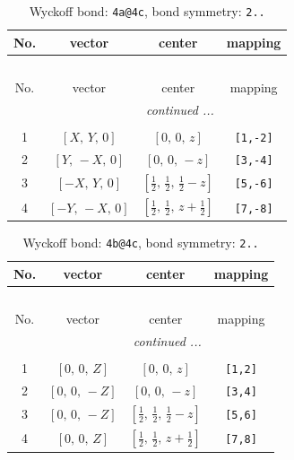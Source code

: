\documentclass[fleqn,8pt]{jsarticle}
\begin{document}
\begin{longtable}{cccc}
\caption{Wyckoff bond: {\tt 4a@4c}, bond symmetry: {\tt 2..}}
 \\
 \hline \hline
No. & vector & center & mapping \\ \hline \endfirsthead

\multicolumn{3}{l}{\tablename\ \thetable{}} \\
 \hline \hline
No. & vector & center & mapping \\ \hline \endhead

 \hline \hline
\multicolumn{3}{r}{\footnotesize\it continued ...} \\ \endfoot

 \hline \hline
\multicolumn{3}{r}{} \\ \endlastfoot

1 & $\left[ X,\, Y,\, 0 \right]$ & $\left[ 0,\, 0,\, z \right]$ & {\tt [1,-2]} \\ \hline
2 & $\left[ Y,\, - X,\, 0 \right]$ & $\left[ 0,\, 0,\, - z \right]$ & {\tt [3,-4]} \\ \hline
3 & $\left[ - X,\, Y,\, 0 \right]$ & $\left[ \frac{1}{2},\, \frac{1}{2},\, \frac{1}{2} - z \right]$ & {\tt [5,-6]} \\ \hline
4 & $\left[ - Y,\, - X,\, 0 \right]$ & $\left[ \frac{1}{2},\, \frac{1}{2},\, z + \frac{1}{2} \right]$ & {\tt [7,-8]} \\
\end{longtable}
\renewcommand{\arraystretch}{1.2}
\begin{longtable}{cccc}
\caption{Wyckoff bond: {\tt 4b@4c}, bond symmetry: {\tt 2..}}
 \\
 \hline \hline
No. & vector & center & mapping \\ \hline \endfirsthead

\multicolumn{3}{l}{\tablename\ \thetable{}} \\
 \hline \hline
No. & vector & center & mapping \\ \hline \endhead

 \hline \hline
\multicolumn{3}{r}{\footnotesize\it continued ...} \\ \endfoot

 \hline \hline
\multicolumn{3}{r}{} \\ \endlastfoot

1 & $\left[ 0,\, 0,\, Z \right]$ & $\left[ 0,\, 0,\, z \right]$ & {\tt [1,2]} \\ \hline
2 & $\left[ 0,\, 0,\, - Z \right]$ & $\left[ 0,\, 0,\, - z \right]$ & {\tt [3,4]} \\ \hline
3 & $\left[ 0,\, 0,\, - Z \right]$ & $\left[ \frac{1}{2},\, \frac{1}{2},\, \frac{1}{2} - z \right]$ & {\tt [5,6]} \\ \hline
4 & $\left[ 0,\, 0,\, Z \right]$ & $\left[ \frac{1}{2},\, \frac{1}{2},\, z + \frac{1}{2} \right]$ & {\tt [7,8]} \\
\end{longtable}
\end{document}
